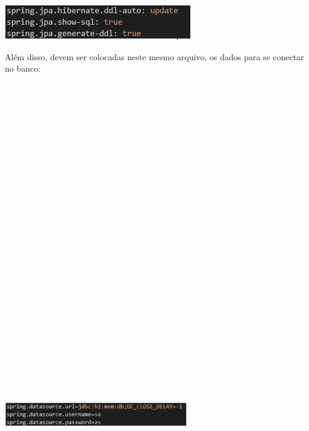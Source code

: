 \documentclass[conference]{IEEEtran}
\begin{document}
\vspace{7mm}
\centerline{\includegraphics{AlgoritmoHibernate.png}}
\vspace{7mm}

Além disso, devem ser colocadas neste mesmo arquivo, os dados para se conectar no banco:

\vspace{7mm}
\centerline{\includegraphics[width=80mm,height=600mm,keepaspectratio]{Postegresql.png}}
\vspace{7mm}
\end{document}
